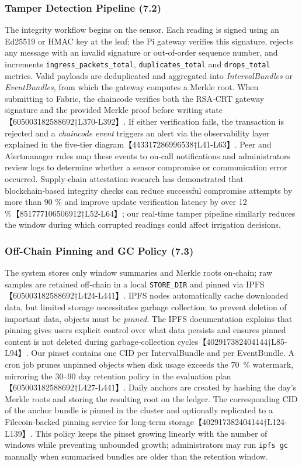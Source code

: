 \documentclass[12pt,onecolumn]{IEEEtran} %
\begin{document}
\subsubsection{Tamper Detection Pipeline (7.2)}
The integrity workflow begins on the sensor.  Each reading is signed using
an Ed25519 or HMAC key at the leaf; the Pi gateway verifies this signature,
rejects any message with an invalid signature or out‑of‑order sequence
number, and increments \texttt{ingress\_packets\_total},
\texttt{duplicates\_total} and \texttt{drops\_total} metrics.  Valid
payloads are deduplicated and aggregated into \emph{IntervalBundles} or
\emph{EventBundles}, from which the gateway computes a Merkle root.  When
submitting to Fabric, the chaincode verifies both the RSA‑CRT gateway
signature and the provided Merkle proof before writing state【605003182588692†L370-L392】.
If either verification fails, the transaction is rejected and a
\emph{chaincode event} triggers an alert via the observability layer
explained in the five‑tier diagram【443317286996538†L41-L63】.  Peer and
Alertmanager rules map these events to on‑call notifications and
administrators review logs to determine whether a sensor compromise or
communication error occurred.  Supply‑chain attestation research has
demonstrated that blockchain‑based integrity checks can reduce successful
compromise attempts by more than 90 \% and improve update verification
latency by over 12 \%【851777106506912†L52-L64】; our real‑time tamper
pipeline similarly reduces the window during which corrupted readings could
affect irrigation decisions.

\subsubsection{Off‑Chain Pinning and GC Policy (7.3)}
The system stores only window summaries and Merkle roots on‑chain; raw
samples are retained off‑chain in a local \texttt{STORE\_DIR} and pinned
via IPFS【605003182588692†L424-L441】.  IPFS nodes automatically cache
downloaded data, but limited storage necessitates garbage collection; to
prevent deletion of important data, objects must be \emph{pinned}.  The
IPFS documentation explains that pinning gives users explicit control over
what data persists and ensures pinned content is not deleted during
garbage‑collection cycles【402917382404144†L85-L94】.  Our pinset contains one
CID per IntervalBundle and per EventBundle.  A cron job prunes unpinned
objects when disk usage exceeds the 70~\% watermark, mirroring the
30–90 day retention policy in the evaluation plan【605003182588692†L427-L441】.
Daily anchors are created by hashing the day’s Merkle roots and storing
the resulting root on the ledger.  The corresponding CID of the anchor
bundle is pinned in the cluster and optionally replicated to a
Filecoin‑backed pinning service for long‑term storage【402917382404144†L124-L139】.
This policy keeps the pinset growing linearly with the number of windows
while preventing unbounded growth; administrators may run \texttt{ipfs gc}
manually when summarised bundles are older than the retention window.
\end{document}
